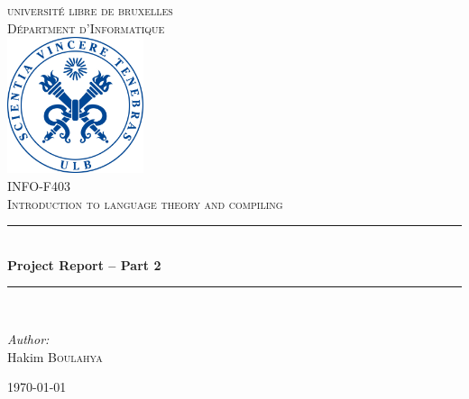 \documentclass[letterpaper]{article}
\newcommand{\HRule}{\rule{\linewidth}{0.5mm}} %
\begin{document}
\begin{titlepage}
\begin{center}


\textsc{\LARGE universit\'e libre de bruxelles}\\[1.0cm]
\textsc{\Large D\'epartment d'Informatique}\\[1.5cm]

\includegraphics[width=0.3\textwidth]{image/ulblogo.jpg}~\\[1cm]

\textsc{
\large INFO-F403 \\
\Large  Introduction to language theory and compiling
 \\[1cm]}
\HRule \\[0.7cm]

{ \huge \bfseries Project Report – Part 2  \\[0.7cm] }

\HRule \\[2cm]

\noindent
\begin{center} \large

\emph{Author:}\\
\Large Hakim \textsc{Boulahya}\\
\end{center}
\begin{center} \large


\end{center}

\vfill

{\large \today}

\end{center}
\end{titlepage}

\tableofcontents
\newpage
\end{document}
